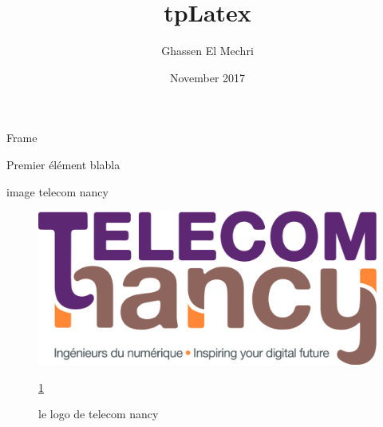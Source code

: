 \documentclass{beamer}
\title{tpLatex}
\author{Ghassen El Mechri}
\date{November 2017}
\begin{document}
\maketitle
\begin{frame}{Frame}
\begin{block}{Premier élément}
blabla
\end{block}
\end{frame}


\begin{frame}{image telecom nancy}

    \begin{figure}
        \centering
        \includegraphics[scale=0.1]{logo_TNCY.png}
        \caption{le logo de telecom nancy}
        \label{fig:logo_TNCY}
        \ref{fig:logo_TNCY}
    \end{figure}
\end{frame}
\end{document}
